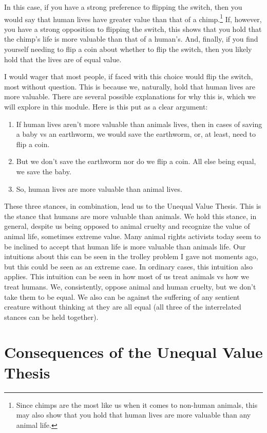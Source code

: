 In this case, if you have a strong preference to flipping the switch, then you would say that human lives have greater value than that of a chimp.\footnote{Since chimps are the most like us when it comes to non-human animals, this may also show that you hold that human lives are more valuable than any animal life.} If, however, you have a strong opposition to flipping the switch, this shows that you hold that the chimp's life is more valuable than that of a human's. And, finally, if you find yourself needing to flip a coin about whether to flip the switch, then you likely hold that the lives are of equal value. 

I would wager that most people, if faced with this choice would flip the switch, most without question. This is because we, naturally, hold that human lives are more valuable. There are several possible explanations for why this is, which we will explore in this module. Here is this put as a clear argument:

\begin{enumerate}
    \item If human lives aren’t more valuable than animals lives, then in cases of saving a baby vs an earthworm, we would save the earthworm, or, at least, need to flip a coin.
    \item But we don’t save the earthworm nor do we flip a coin. All else being equal, we save the baby.
    \item So, human lives are more valuable than animal lives.
\end{enumerate}
 
These three stances, in combination, lead us to the Unequal Value Thesis. This is the stance that humans are more valuable than animals. We hold this stance, in general, despite us being opposed to animal cruelty and recognize the value of animal life, sometimes extreme value. Many animal rights activists today seem to be inclined to accept that human life is more valuable than animals life. Our intuitions about this can be seen in the trolley problem I gave not moments ago, but this could be seen as an extreme case. In ordinary cases, this intuition also applies. This intuition can be seen in how most of us treat animals vs how we treat humans. We, consistently, oppose animal and human cruelty, but we don’t take them to be equal. We also can be against the suffering of any sentient creature without thinking at they are all equal (all three of the interrelated stances can be held together). 

\section{Consequences of the Unequal Value Thesis}

